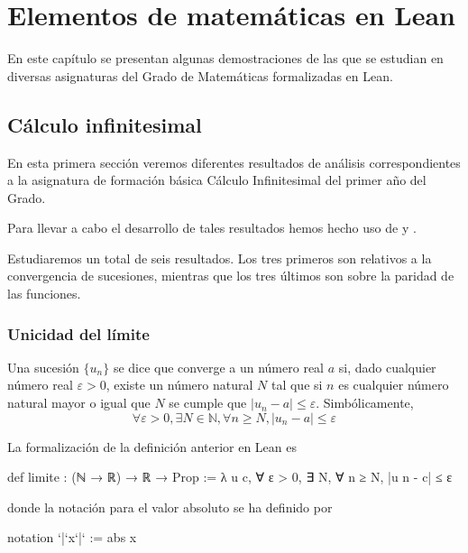 \chapter{Elementos de matemáticas en Lean}

En este capítulo se presentan algunas demostraciones de las que se
estudian en diversas asignaturas del Grado de Matemáticas formalizadas
en Lean.

\section{Cálculo infinitesimal}

En esta primera sección veremos diferentes resultados de análisis
correspondientes a la asignatura de formación básica Cálculo
Infinitesimal del primer año del Grado.

Para llevar a cabo el desarrollo de tales resultados hemos hecho uso
de \cite{ML} y \cite{LP}.

Estudiaremos un total de seis resultados. Los tres primeros son relativos
a la convergencia de sucesiones, mientras que los tres últimos son sobre
la paridad de las funciones.


\subsection{Unicidad del límite}

\begin{definicion}\label{limite}
  Una sucesión \(\{u_n\}\) se dice que converge a un número real \(a\) si,
  dado cualquier número real \(ε > 0\), existe un número natural \(N\)
  tal que si \(n\) es cualquier número natural mayor o igual que \(N\) se
  cumple que \(|u_n-a| ≤ ε\). Simbólicamente,
  \[∀ ε > 0, ∃ N ∈ ℕ, ∀ n ≥ N, |u_n-a| ≤ ε\]
\end{definicion}


La formalización de la definición anterior en Lean es
\begin{leancode}
def limite : (ℕ → ℝ) → ℝ → Prop :=
λ u c, ∀ ε > 0, ∃ N, ∀ n ≥ N, |u n - c| ≤ ε
\end{leancode}
donde la notación para el valor absoluto se ha definido por
\begin{leancode}
notation `|`x`|` := abs x
\end{leancode}

